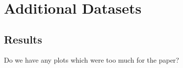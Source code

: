 \section{Additional Datasets}

\subsection{Results}

Do we have any plots which were too much for the paper?

